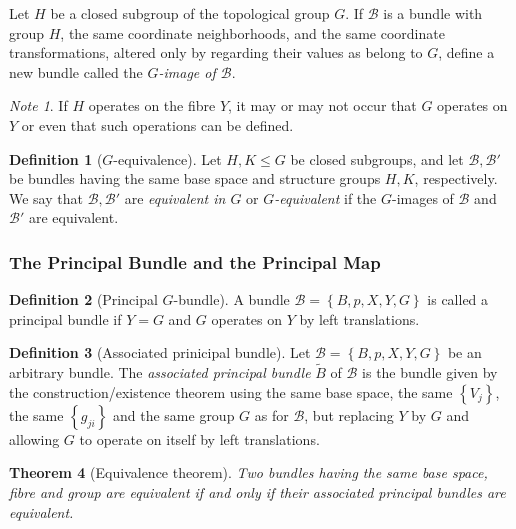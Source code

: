 \documentclass[reqno]{amsart}
\newtheorem{theorem}{Theorem}[section]
\theoremstyle{definition}
\newtheorem{definition}[theorem]{Definition}
\theoremstyle{remark}
\newtheorem*{note}{Note}
\begin{document}
Let $H$ be a closed subgroup of the
topological group $G$.
If $\mathcal{B}$ is a bundle with group $H$, the
same coordinate neighborhoods, and the same
coordinate transformations, altered
only by regarding their values as belong to $G$, define
a new bundle called the
\textit{$G$-image of $\mathcal{B}$}.\\
\begin{note}
    If $H$ operates on the fibre $Y$, it may or may not
    occur that $G$ operates on $Y$ or even 
    that such operations can be defined.
\end{note}

\begin{definition}[$G$-equivalence]
    Let $H,K \le G$ be closed subgroups, and let
    $\mathcal{B},\mathcal{B}'$ be bundles having the same
    base space and structure groups
    $H,K$, respectively. We say that
    $\mathcal{B},\mathcal{B}'$ are \textit{equivalent in
    $G$} or \textit{$G$-equivalent} if the
    $G$-images of $\mathcal{B}$ and
    $\mathcal{B}'$ are equivalent.
\end{definition}


\subsubsection{The Principal Bundle and the Principal Map}

\begin{definition}[Principal $G$-bundle]
    A bundle
    $\mathcal{B} = 
    \left\{ B,p,X,Y,G \right\} $ is called
    a principal bundle if $Y = G$ and
    $G$ operates on $Y $ by left translations.
\end{definition}

\begin{definition}[Associated prinicipal bundle]
    Let $\mathcal{B} = \left\{ B,p,X,Y,G \right\} $ be
    an arbitrary bundle. The
    \textit{associated principal bundle}
    $\tilde{B}$ of $\mathcal{B}$ is the bundle given
    by the construction/existence theorem using the
    same base space, the same $\left\{ V_j \right\} $,
    the same $\left\{ g_{ji} \right\} $ and
    the same group $G$ as for $\mathcal{B}$, but
    replacing $Y$ by $G$ and allowing $G$ to operate
    on itself by left translations.
\end{definition}

\begin{theorem}[Equivalence theorem]\label{Equivalence-theorem}
    Two bundles having the same base space, fibre
    and group are equivalent if and only if their
    associated principal bundles are equivalent.
\end{theorem}
\end{document}
